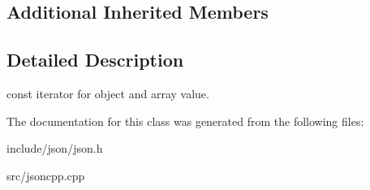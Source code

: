 \subsection*{Additional Inherited Members}


\subsection{Detailed Description}
const iterator for object and array value. 



The documentation for this class was generated from the following files\-:\begin{DoxyCompactItemize}
\item 
include/json/json.\-h\item 
src/jsoncpp.\-cpp\end{DoxyCompactItemize}
